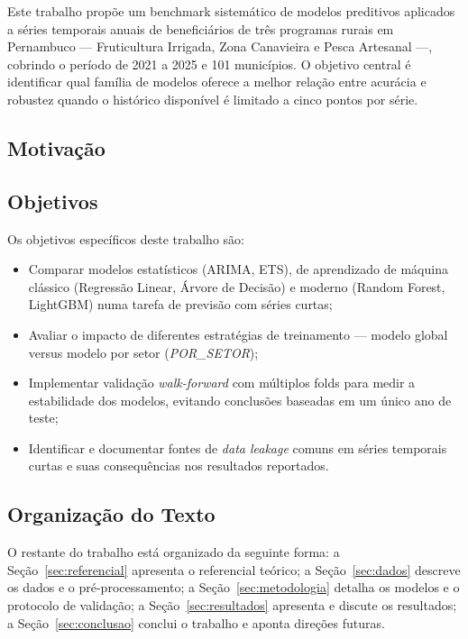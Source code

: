\documentclass[12pt, a4paper]{article}
\begin{document}
Este trabalho propõe um benchmark sistemático de modelos preditivos aplicados
a séries temporais anuais de beneficiários de três programas rurais em
Pernambuco --- Fruticultura Irrigada, Zona Canavieira e Pesca Artesanal ---,
cobrindo o período de 2021 a 2025 e 101 municípios. O objetivo central é
identificar qual família de modelos oferece a melhor relação entre acurácia e
robustez quando o histórico disponível é limitado a cinco pontos por série.

\subsection{Motivação}

\subsection{Objetivos}

Os objetivos específicos deste trabalho são:

\begin{itemize}[leftmargin=2cm]
  \item Comparar modelos estatísticos (ARIMA, ETS), de aprendizado de máquina
        clássico (Regressão Linear, Árvore de Decisão) e moderno
        (Random Forest, LightGBM) numa tarefa de previsão com séries curtas;
  \item Avaliar o impacto de diferentes estratégias de treinamento ---
        modelo global versus modelo por setor (\textit{POR\_SETOR});
  \item Implementar validação \textit{walk-forward} com múltiplos folds para
        medir a estabilidade dos modelos, evitando conclusões baseadas em
        um único ano de teste;
  \item Identificar e documentar fontes de \textit{data leakage} comuns em
        séries temporais curtas e suas consequências nos resultados reportados.
\end{itemize}

\subsection{Organização do Texto}

O restante do trabalho está organizado da seguinte forma:
a Seção~\ref{sec:referencial} apresenta o referencial teórico;
a Seção~\ref{sec:dados} descreve os dados e o pré-processamento;
a Seção~\ref{sec:metodologia} detalha os modelos e o protocolo de validação;
a Seção~\ref{sec:resultados} apresenta e discute os resultados;
a Seção~\ref{sec:conclusao} conclui o trabalho e aponta direções futuras.
\end{document}
